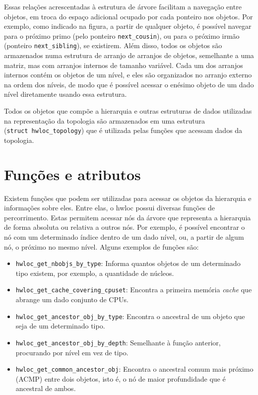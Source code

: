 Essas relações acrescentadas à estrutura de árvore facilitam a navegação entre objetos, em troca do espaço adicional ocupado por cada ponteiro nos objetos.
Por exemplo, como indicado na figura, a partir de qualquer objeto, é possível navegar para o próximo primo (pelo ponteiro \texttt{next\_cousin}), ou para o próximo irmão (ponteiro \texttt{next\_sibling}), se existirem.
Além disso, todos os objetos são armazenados numa estrutura de arranjo de arranjos de objetos, semelhante a uma matriz, mas com arranjos internos de tamanho variável.
Cada um dos arranjos internos contém os objetos de um nível, e eles são organizados no arranjo externo na ordem dos níveis, de modo que é possível acessar o enésimo objeto de um dado nível diretamente usando essa estrutura.

Todos os objetos que compõe a hierarquia e outras estruturas de dados utilizadas na representação da topologia são armazenados em uma estrutura (\texttt{struct~hwloc\_topology}) que é utilizada pelas funções que acessam dados da topologia.


\section{Funções e atributos}

Existem funções que podem ser utilizadas para acessar os objetos da hierarquia e informações sobre eles.
Entre elas, o hwloc possui diversas funções de percorrimento.
Estas permitem acessar nós da árvore que representa a hierarquia de forma absoluta ou relativa a outros nós.
Por exemplo, é possível encontrar o nó com um determinado índice dentro de um dado nível,
ou, a partir de algum nó, o próximo no mesmo nível.
Alguns exemplos de funções são:
\begin{itemize}
	\item \texttt{hwloc\_get\_nbobjs\_by\_type}: Informa quantos objetos de um determinado tipo existem, por exemplo, a quantidade de núcleos.
	\item \texttt{hwloc\_get\_cache\_covering\_cpuset}: Encontra a primeira memória \textit{cache} que abrange um dado conjunto de CPUs.
	\item \texttt{hwloc\_get\_ancestor\_obj\_by\_type}: Encontra o ancestral de um objeto que seja de um determinado tipo.
	\item \texttt{\texttt{hwloc\_get\_ancestor\_obj\_by\_depth}}: Semelhante à função anterior, procurando por nível em vez de tipo.
	\item \texttt{hwloc\_get\_common\_ancestor\_obj}: Encontra o ancestral comum mais próximo (ACMP) entre dois objetos, isto é, o nó de maior profundidade que é ancestral de ambos.
\end{itemize}

